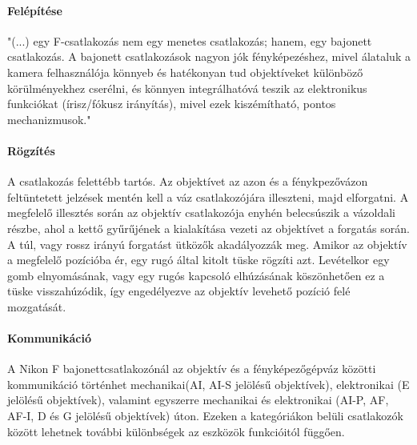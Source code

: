 \paragraph{Felépítése}

"(...) egy F-csatlakozás nem egy menetes csatlakozás; hanem, egy bajonett csatlakozás. A bajonett csatlakozások nagyon jók fényképezéshez, mivel álataluk a kamera felhasználója könnyeb és hatékonyan tud objektíveket különböző körülményekhez cserélni, és könnyen integrálhatóvá teszik az elektronikus funkciókat (írisz/fókusz irányítás), mivel ezek kiszémítható, pontos mechanizmusok."\cite{Nikon-bajonett}
\paragraph{Rögzítés}
A csatlakozás felettébb tartós\cite{Nikon_F_mount-ról}.
Az objektívet az azon és a fénykpezővázon feltüntetett jelzések mentén kell a váz csatlakozójára illeszteni, majd elforgatni.
A megfelelő illesztés során az objektív csatlakozója enyhén belecsúszik a vázoldali részbe, ahol a kettő gyűrűjének a kialakítása vezeti az objektívet a forgatás során.
A túl, vagy rossz irányú forgatást ütközők akadályozzák meg.
Amikor az objektív a megfelelő pozícióba ér, egy rugó által kitolt tüske rögzíti azt.
Levételkor egy gomb elnyomásának, vagy egy rugós kapcsoló elhúzásának köszönhetően ez a tüske visszahúzódik, így engedélyezve az objektív levehető pozíció felé mozgatását.

\paragraph{Kommunikáció}
A Nikon F bajonettcsatlakozónál az objektív és a fényképezőgépváz közötti kommunikáció történhet mechanikai(AI, AI-S jelölésű objektívek)\cite{Lens_naming}, elektronikai (E jelölésű objektívek)\cite{Lens_naming}, valamint egyszerre mechanikai és elektronikai (AI-P, AF, AF-I, D és G jelölésű objektívek)%
\cite{Nikon_CPU}úton. Ezeken a kategóriákon belüli csatlakozók között lehetnek további különbségek az eszközök funkcióitól függően.

